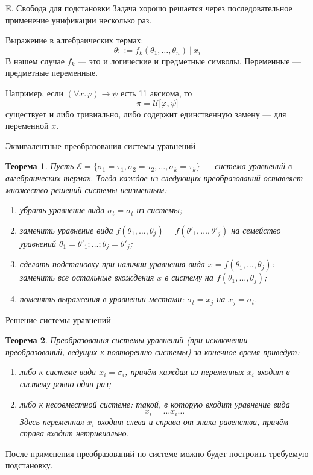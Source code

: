 \documentclass[aspectratio=169]{beamer}
\newtheorem{thm}{Теорема}[section]
\begin{document}
\begin{frame}{E. Свобода для подстановки}
Задача хорошо решается через последовательное применение унификации несколько раз.

Выражение в алгебраических термах: $$\theta ::= f_k(\theta_1,\dots,\theta_n)\ |\ x_i$$
В нашем случае $f_k$ --- это и логические и предметные символы. Переменные --- предметные переменные.

Например, если $(\forall x.\varphi) \rightarrow \psi$ есть 11 аксиома, то
$$\pi = \mathcal{U}\big[\varphi,\psi\big]$$ существует и либо тривиально, либо содержит единственную замену --- для
переменной $x$. 
\end{frame}

\begin{frame}{Эквивалентные преобразования системы уравнений}
\begin{thm}
Пусть $\mathcal{E} = \{ \sigma_1=\tau_1, \sigma_2=\tau_2, \dots, \sigma_k=\tau_k \}$ --- система 
уравнений в алгебраических термах. Тогда каждое из следующих преобразований оставляет множество
решений системы неизменным:
\begin{enumerate}
\item убрать уравнение вида $\sigma_t=\sigma_t$ из системы;
\item заменить уравнение вида $f(\theta_1, \dots, \theta_j) = f(\theta'_1, \dots, \theta'_j)$ на
семейство уравнений $\theta_1=\theta'_1; \dots; \theta_j=\theta'_j$;
\item сделать подстановку при наличии уравнения вида $x = f(\theta_1, \dots, \theta_j)$: заменить
все остальные вхождения $x$ в систему на $f(\theta_1, \dots, \theta_j)$;
\item поменять выражения в уравнении местами: $\sigma_t=x_j$ на $x_j=\sigma_t$.
\end{enumerate}
\end{thm}
\end{frame}

\begin{frame}{Решение системы уравнений}
\begin{thm}
Преобразования системы уравнений (при исключении преобразований, ведущих к повторению системы) 
за конечное время приведут:
\begin{enumerate}
\item либо к системе вида $x_i = \sigma_i$, причём каждая из переменных $x_i$
входит в систему ровно один раз;
\item либо к несовместной системе: такой, в которую входит уравнение вида $$x_i = \dots x_i \dots$$
Здесь переменная $x_i$ входит слева и справа от знака равенства, причём справа входит нетривиально.
\end{enumerate}
\end{thm}

После применения преобразований по системе можно будет построить требуемую подстановку.
\end{frame}
\end{document}
